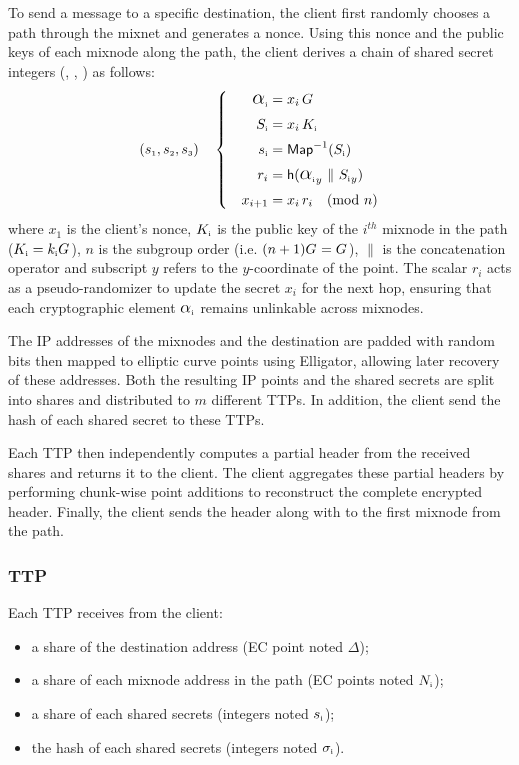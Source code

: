To send a message to a specific destination, the client first randomly chooses a path through the mixnet and generates a nonce.
Using this nonce and the public keys of each mixnode along the path, the client derives a chain of shared secret integers (, , ) as follows:
\begin{equation}
(\s{1}, \s{2}, \s{3}) \quad \left\{ \quad
\begin{aligned}
    \A{i}    &= x_i \, G \\
    \S{i}    &= x_i \, \PK{i} \\
    \s{i}    &= \InverseMap{\S{i}} \\
    r_i      &= \hash{{\A{i}}_y \ \| \ {\S{i}}_y} \\
    x_{i+1}  &= x_i \, r_i \quad (\text{mod}\ n)
\end{aligned}
\right.
\label{eq:shared_secret}
\end{equation}
where $ x_1 $ is the client's nonce, $ \PK{i} $ is the public key of the $ i^{th} $ mixnode in the path ($\PK{i} = \sk{i}\G{}$), 
$ n $ is the subgroup order (i.e. $(n+1)\G{} = \G{}$), $ \| $ is  the concatenation operator and subscript $ y $ refers to the $ y $-coordinate of the point.
The scalar $ r_i $ acts as a pseudo-randomizer to update the secret $ x_i $ for the next hop, 
ensuring that each cryptographic element $ \A{i} $ remains unlinkable across mixnodes.

The IP addresses of the mixnodes and the destination are padded with random bits
then mapped to elliptic curve points using Elligator, allowing later recovery of these addresses.
Both the resulting IP points and the shared secrets are split into shares and distributed to $ m $ different TTPs. 
In addition, the client send the hash of each shared secret to these TTPs. %

Each TTP then independently computes a partial header from the received shares and returns it to the client. 
The client aggregates these partial headers by performing chunk-wise point additions to reconstruct the complete encrypted header.
Finally, the client sends the header along with  to the first mixnode from the path. 

\subsubsection{TTP}
Each TTP receives from the client:
\begin{itemize}
    \item a share of the destination address (EC point noted $ \Delta $);
    \item a share of each mixnode address in the path (EC points noted $ \N{i} $);
    \item a share of each shared secrets (integers noted $ \s{i} $);
    \item the hash of each shared secrets (integers noted $ \sHashed{i} $).
\end{itemize}

